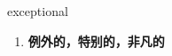 
\begin{frame}
{\huge exceptional}
\begin{center}
\begin{enumerate}\Large
  \item \textbf{例外的，特别的，非凡的}
\end{enumerate}
\end{center}
\end{frame}
